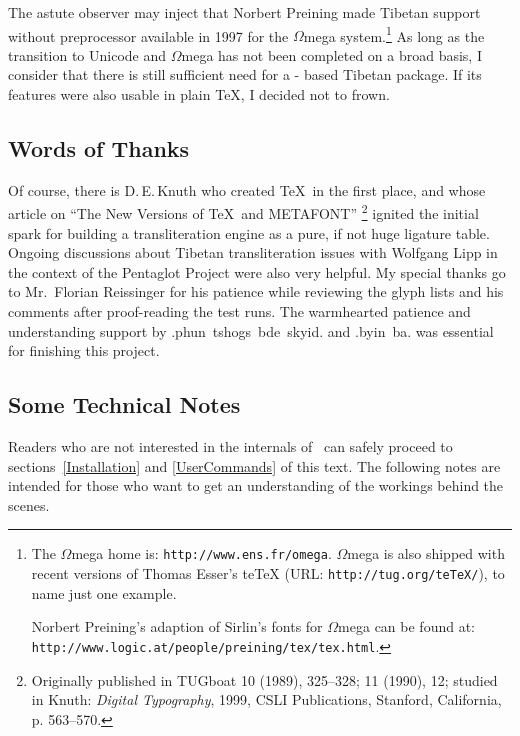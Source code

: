 \documentclass[a4paper,11pt]{article}
\begin{document}
The astute observer may inject that Norbert Preining made Tibetan support
without preprocessor available in 1997 for the $\Omega$mega system.\footnote{%
	The $\Omega$mega home is: 
	\texttt{http://www.ens.fr/omega}. $\Omega$mega is also shipped
	with recent versions of Thomas Esser's teTeX (URL:
	\texttt{http://tug.org/teTeX/}), to name just one example.
	
	Norbert Preining's adaption of Sirlin's fonts for $\Omega$mega
	can be found at:
	\texttt{http://www.logic.at/people/preining/tex/tex.html}.}
%
%
As long as
the transition to Unicode and $\Omega$mega has not been completed on a
broad basis, I consider that there is still sufficient need for a \LaTeXe-%
based Tibetan package. If its features were also usable in plain \TeX,
I decided not to frown.


\subsection{Words of Thanks}

Of course, there is D.\,E.\,Knuth who created \TeX\ in the first place,
and whose article on ``The New Versions of \TeX\ and \textsf{METAFONT}''%
\footnote{Originally published in TUGboat 10 (1989), 325--328; 11 (1990),
	12; studied in Knuth: \textit{Digital Typography}, 1999,
	CSLI Publications, Stanford, California, p. 563--570.}
ignited the initial spark for building a transliteration engine as a
pure, if not huge ligature table.
Ongoing discussions about Tibetan transliteration issues with Wolfgang Lipp
in the context of the Pentaglot Project were also very helpful.
My special thanks go to Mr.~Florian Reissinger for his patience while
reviewing the glyph lists and his comments after proof-reading the
test runs. The warmhearted patience and understanding support by
\hbox{\tib .phun tshogs bde skyid.} and \hbox{\tib .byin ba.} was
essential for finishing this project.


\subsection{Some Technical Notes}

Readers who are not interested in the internals of \TibTeX\
can safely proceed to sections~\ref{Installation} and 
\ref{UserCommands} of this text. The following notes are intended
for those who want to get an understanding of the workings behind 
the scenes.
\end{document}

